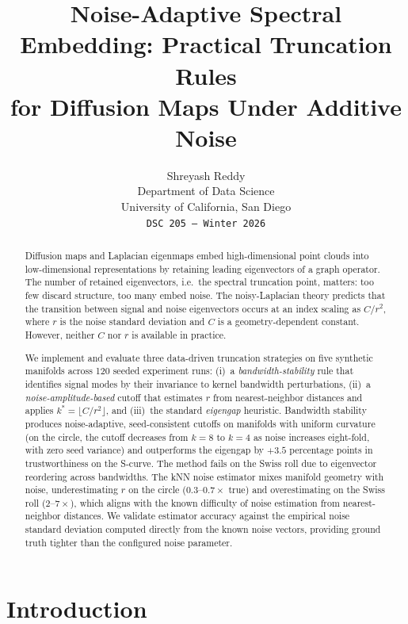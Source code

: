 \documentclass{article}
\title{Noise-Adaptive Spectral Embedding: Practical Truncation Rules \\ for Diffusion Maps Under Additive Noise}
\author{
  Shreyash Reddy \\
  Department of Data Science \\
  University of California, San Diego \\
  \texttt{DSC 205 --- Winter 2026}
}
\begin{document}
\maketitle

\begin{abstract}
Diffusion maps and Laplacian eigenmaps embed high-dimensional point clouds into low-dimensional representations by retaining leading eigenvectors of a graph operator. The number of retained eigenvectors, i.e.\ the spectral truncation point, matters: too few discard structure, too many embed noise. The noisy-Laplacian theory predicts that the transition between signal and noise eigenvectors occurs at an index scaling as $C/r^2$, where $r$ is the noise standard deviation and $C$ is a geometry-dependent constant. However, neither $C$ nor $r$ is available in practice.

We implement and evaluate three data-driven truncation strategies on five synthetic manifolds across 120 seeded experiment runs: (i)~a \emph{bandwidth-stability} rule that identifies signal modes by their invariance to kernel bandwidth perturbations, (ii)~a \emph{noise-amplitude-based} cutoff that estimates $r$ from nearest-neighbor distances and applies $k^* = \lfloor C/r^2 \rfloor$, and (iii)~the standard \emph{eigengap} heuristic. Bandwidth stability produces noise-adaptive, seed-consistent cutoffs on manifolds with uniform curvature (on the circle, the cutoff decreases from $k{=}8$ to $k{=}4$ as noise increases eight-fold, with zero seed variance) and outperforms the eigengap by $+3.5$ percentage points in trustworthiness on the S-curve. The method fails on the Swiss roll due to eigenvector reordering across bandwidths. The kNN noise estimator mixes manifold geometry with noise, underestimating $r$ on the circle ($0.3$--$0.7\times$ true) and overestimating on the Swiss roll ($2$--$7\times$), which aligns with the known difficulty of noise estimation from nearest-neighbor distances. We validate estimator accuracy against the empirical noise standard deviation computed directly from the known noise vectors, providing ground truth tighter than the configured noise parameter.
\end{abstract}

\section{Introduction}
\label{sec:intro}
\end{document}
